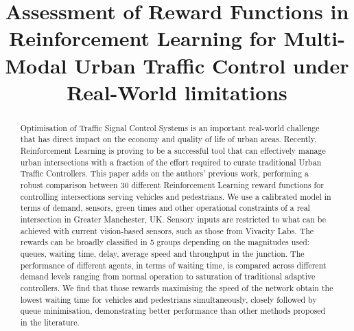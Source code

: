 \documentclass[conference]{IEEEtran}
\begin{document}
\title{Assessment of Reward Functions in Reinforcement Learning for Multi-Modal Urban Traffic Control under Real-World limitations}


\author{
\and
{}
}

\maketitle

\begin{abstract}
Optimisation of Traffic Signal Control Systems is an important real-world challenge that has direct impact on the economy and quality of life of urban areas.
Recently, Reinforcement Learning is proving to be a successful tool that can effectively manage urban intersections with a fraction of the effort required to curate traditional Urban Traffic Controllers. 
This paper adds on the authors' previous work, performing a robust comparison between 30 different Reinforcement Learning reward functions for controlling intersections serving vehicles and pedestrians. 
We use a calibrated model in terms of demand, sensors, green times and other operational constraints of a real intersection in Greater Manchester, UK. 
Sensory inputs are restricted to what can be achieved with current vision-based sensors, such as those from Vivacity Labs.
The rewards can be broadly classified in 5 groups depending on the magnitudes used: queues, waiting time, delay, average speed and throughput in the junction.
 The performance of different agents, in terms of waiting time, is compared across different demand levels ranging from normal operation to saturation of traditional adaptive controllers.
We find that those rewards maximising the speed of the network obtain the lowest waiting time for vehicles and pedestrians simultaneously, closely followed by queue minimisation, demonstrating better performance than other methods proposed in the literature.
\end{abstract}
\end{document}
